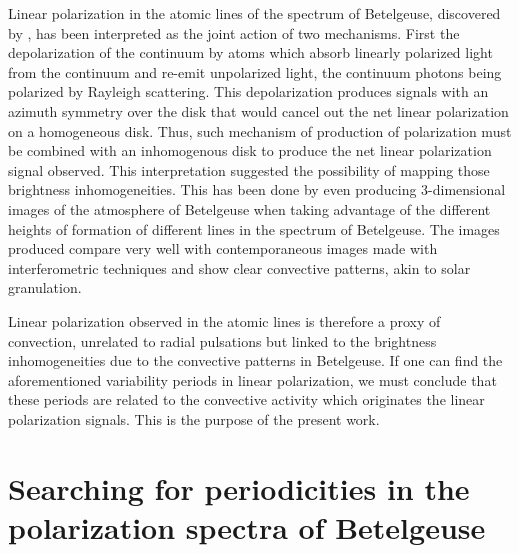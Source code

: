 \documentclass{aa}
\begin{document}
Linear polarization in the atomic lines of the spectrum of Betelgeuse, discovered by \cite{auriere_discovery_2016}, has been interpreted as the joint action of 
two mechanisms. First the depolarization of the continuum by atoms which absorb linearly polarized light from the continuum and re-emit unpolarized light, the 
continuum photons being polarized by Rayleigh scattering. This depolarization produces signals with an azimuth symmetry over the disk that 
would  cancel out the net linear polarization on a homogeneous disk. Thus, such mechanism of production of polarization must be combined with an inhomogenous disk to produce the net linear polarization 
signal observed. This interpretation suggested the possibility of mapping those brightness inhomogeneities. This has been done by \cite{lopez_ariste_convective_2018} 
even producing 3-dimensional images of the atmosphere of Betelgeuse \citep{lopez_ariste_three-dimensional_2022} when taking advantage of the different heights of formation of 
different lines in the spectrum of Betelgeuse. The images produced compare very well with contemporaneous images made with interferometric 
techniques \citep{montarges_close_2016} and show clear convective patterns, akin to solar granulation.

Linear polarization observed in the atomic lines is therefore a proxy of convection, unrelated to radial 
pulsations but linked to the brightness inhomogeneities due to the convective patterns in Betelgeuse. If one can find the 
aforementioned variability periods 
in linear polarization, we must conclude that these periods are related to the convective activity which originates the linear 
polarization signals.
This is the purpose of the present work. 



\section{Searching for periodicities in the polarization spectra of Betelgeuse}
\label{Section 2}
\end{document}
